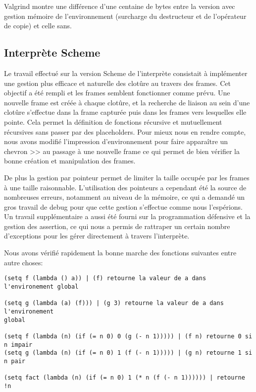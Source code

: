 \documentclass[a4paper,11pt]{article}
\begin{document}
Valgrind montre une différence d'une centaine de bytes entre la version avec
gestion mémoire de l'environnement (surcharge du destructeur et de l'opérateur
de copie) et celle sans.

 \subsection{Interprète Scheme}

 Le travail effectué sur la version Scheme de l'interprète consistait à implémenter 
 une gestion plus efficace et naturelle des clotûre au travers des frames. Cet 
 objectif a été rempli et les frames semblent fonctionner comme prévu. Une nouvelle
 frame est créée à chaque clotûre, et la recherche de liaison au sein d'une clotûre 
 s'effectue dans la frame capturée puis dans les frames vers lesquelles elle pointe. 
 Cela permet la définition de fonctions récursive et mutuellement récursives sans 
 passer par des placeholders. Pour mieux nous en rendre compte, nous avons
 modifié l'impression d'environnement pour faire apparaître un chevron >> au
 passage à une nouvelle frame ce qui permet de bien vérifier la bonne création
 et manipulation des frames.
 
 De plus la gestion par pointeur permet de limiter la taille occupée par les frames 
 à une taille raisonnable. L'utilisation des pointeurs a cependant été la source de 
 nombreuses erreurs, notamment au niveau de la mémoire, ce qui a demandé un gros 
 travail de debug pour que cette gestion s'effectue comme nous l'espérions. Un travail 
 supplémentaire a aussi été fourni sur la programmation défensive et la gestion des
 assertion, ce qui nous a permis de rattraper un certain nombre d'exceptions pour les 
 gérer directement à travers l'interprète.

 Nous avons vérifié rapidement la bonne marche des fonctions suivantes entre
 autre choses:

\begin{lstlisting}
(setq f (lambda () a)) | (f) retourne la valeur de a dans l'environement global

(setq g (lambda (a) (f))) | (g 3) retourne la valeur de a dans l'environement
global

(setq f (lambda (n) (if (= n 0) 0 (g (- n 1))))) | (f n) retourne 0 si n impair
(setq g (lambda (n) (if (= n 0) 1 (f (- n 1))))) | (g n) retourne 1 si n pair

(setq fact (lambda (n) (if (= n 0) 1 (* n (f (- n 1)))))) | retourne !n
\end{lstlisting}
 
\end{document}

